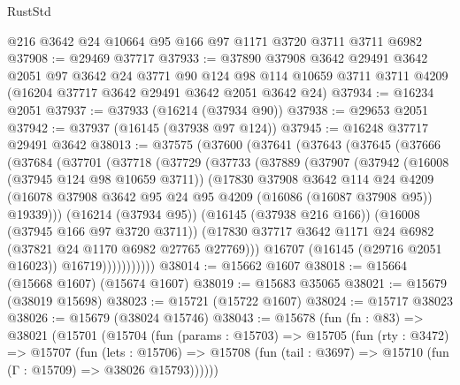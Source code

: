 \begin{lexlean}{RustStd}
\begin{coremodule}
    @216
    @3642
    @24
    @10664
    @95
    @166
    @97
    @1171
    @3720
    @3711
    @3711
    @6982
@37908 := @29469 @37717
@37933 := @37890
    @37908
    @3642
    @29491
    @3642
    @2051
    @97
    @3642
    @24
    @3771
    @90
    @124
    @98
    @114
    @10659
    @3711
    @3711
    @4209
    (@16204 @37717 @3642 @29491 @3642 @2051 @3642 @24)
@37934 := @16234 @2051
@37937 := @37933 (@16214 (@37934 @90))
@37938 := @29653 @2051
@37942 := @37937 (@16145 (@37938 @97 @124))
@37945 := @16248 @37717 @29491 @3642
@38013 := @37575
    (@37600
      (@37641
        (@37643
          (@37645
            (@37666
              (@37684
                (@37701
                  (@37718
                    (@37729
                      (@37733
                        (@37889
                          (@37907
                            (@37942
                              (@16008 (@37945 @124 @98 @10659 @3711))
                              (@17830
                                @37908
                                @3642
                                @114
                                @24
                                @4209
                                (@16078
                                  @37908
                                  @3642
                                  @95
                                  @24
                                  @95
                                  @4209
                                  (@16086 (@16087 @37908 @95))
                                  @19339)))
                            (@16214 (@37934 @95))
                            (@16145 (@37938 @216 @166))
                            (@16008 (@37945 @166 @97 @3720 @3711))
                            (@17830
                              @37717
                              @3642
                              @1171
                              @24
                              @6982
                              (@37821 @24 @1170 @6982 @27765 @27769)))
                          @16707
                          (@16145 (@29716 @2051 @16023))
                          @16719)))))))))))
@38014 := @15662 @1607
@38018 := @15664 (@15668 @1607) (@15674 @1607)
@38019 := @15683 @35065
@38021 := @15679 (@38019 @15698)
@38023 := @15721 (@15722 @1607)
@38024 := @15717 @38023
@38026 := @15679 (@38024 @15746)
@38043 := @15678
    (fun (fn : @83) =>
    @38021
      (@15701
        (@15704
          (fun (params : @15703) =>
          @15705
            (fun (rty : @3472) =>
            @15707
              (fun (lets : @15706) =>
              @15708 (fun (tail : @3697) => @15710 (fun (Γ : @15709) => @38026 @15793))))))

\end{coremodule}
\end{lexlean}
